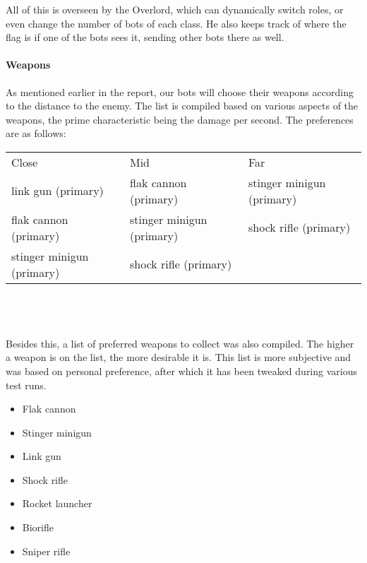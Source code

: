 All of this is overseen by the Overlord, which can dynamically switch roles, or even change the number of bots of each class. He also keeps track of where the flag is if one of the bots sees it, sending other bots there as well.\\

\paragraph{Weapons}
As mentioned earlier in the report, our bots will choose their weapons according to the distance to the enemy. The list is compiled based on various aspects of the weapons, the prime characteristic being the damage per second. The preferences are as follows: \\

\begin{tabular}{| l | l | l |}
  Close & Mid & Far\\
  link gun (primary) & flak cannon (primary) & stinger minigun (primary)\\
  flak cannon (primary) & stinger minigun (primary) & shock rifle (primary)\\
  stinger minigun (primary) & shock rifle (primary) & \\
\end{tabular} \\
\\
\\
Besides this, a list of preferred weapons to collect was also compiled. The higher a weapon is on the list, the more desirable it is. This list is more subjective and was based on personal preference, after which it has been tweaked during various test runs.

\begin{itemize}
	\item Flak cannon
	\item Stinger minigun
	\item Link gun
	\item Shock rifle
	\item Rocket launcher
	\item Biorifle
	\item Sniper rifle
\end{itemize}